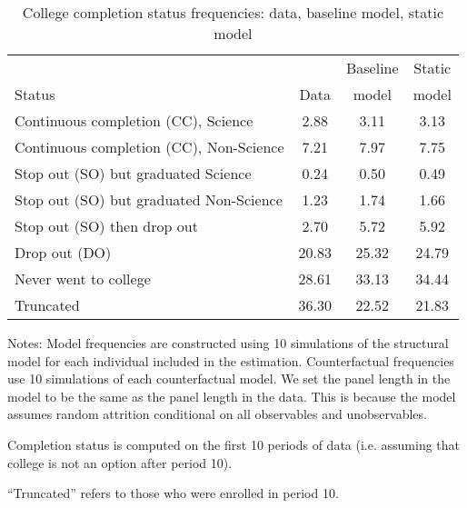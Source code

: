 \begin{table}[ht]
\caption{College completion status frequencies: data, baseline model, static model}
\label{tab:CCDOSOfit}
\centering{}
\begin{threeparttable}
\begin{tabular}{lccc}
\toprule
                                          &      & Baseline & Static \\
Status                                    & Data & model    & model  \\
\midrule
Continuous completion (CC), Science&2.88&3.11&3.13 \\
Continuous completion (CC), Non-Science&7.21&7.97&7.75 \\
Stop out (SO) but graduated Science&0.24&0.50&0.49 \\
Stop out (SO) but graduated Non-Science&1.23&1.74&1.66 \\
Stop out (SO) then drop out&2.70&5.72&5.92 \\
Drop out (DO)&20.83&25.32&24.79 \\
Never went to college&28.61&33.13&34.44 \\
Truncated&36.30&22.52&21.83 \\
\bottomrule
\end{tabular}
\footnotesize Notes: Model frequencies are constructed using 10 simulations of the structural model for each individual included in the estimation. Counterfactual frequencies use 10 simulations of each counterfactual model. We set the panel length in the model to be the same as the panel length in the data. This is because the model assumes random attrition conditional on all observables and unobservables. 

\medskip

Completion status is computed on the first 10 periods of data (i.e. assuming that college is not an option after period 10).

\medskip

``Truncated'' refers to those who were enrolled in period 10.
\end{threeparttable}
\end{table}
